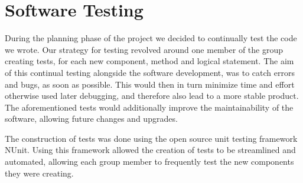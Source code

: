 \section{Software Testing}
During the planning phase of the project we decided to continually test the code we wrote.
Our strategy for testing revolved around one member of the group creating tests, for each new component, method and logical statement.
The aim of this continual testing alongside the software development, was to catch errors and bugs, as soon as possible.
This would then in turn minimize time and effort otherwise used later debugging, and therefore also lead to a more stable product.
The aforementioned tests would additionally improve the maintainability of the software, allowing future changes and upgrades.

The construction of tests was done using the open source unit testing framework NUnit. Using this framework allowed the creation of tests to be streamlined and automated, allowing each group member to frequently test the new components they were creating.

